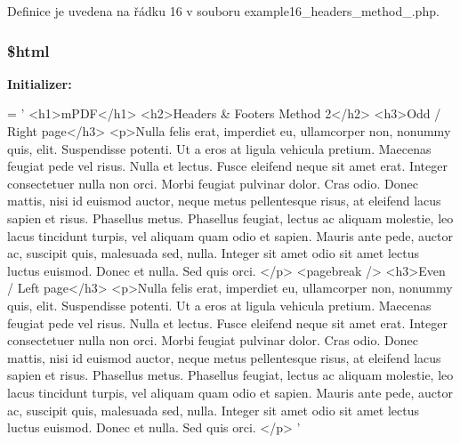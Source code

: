 Definice je uvedena na řádku 16 v souboru example16\-\_\-headers\-\_\-method\-\_.\-php.

\hypertarget{example16__headers__method__2_8php_a6f96e7fc92441776c9d1cd3386663b40}{
\subsubsection[{\$html}]{\setlength{\rightskip}{0pt plus 5cm}\$html}}\label{example16__headers__method__2_8php_a6f96e7fc92441776c9d1cd3386663b40}
{\bfseries Initializer\-:}
\begin{DoxyCode}
= \textcolor{stringliteral}{'}
\textcolor{stringliteral}{<h1>mPDF</h1>}
\textcolor{stringliteral}{<h2>Headers & Footers Method 2</h2>}
\textcolor{stringliteral}{<h3>Odd / Right page</h3>}
\textcolor{stringliteral}{<p>Nulla felis erat, imperdiet eu, ullamcorper non, nonummy quis, elit. Suspendisse potenti. Ut a eros at
       ligula vehicula pretium. Maecenas feugiat pede vel risus. Nulla et lectus. Fusce eleifend neque sit amet
       erat. Integer consectetuer nulla non orci. Morbi feugiat pulvinar dolor. Cras odio. Donec mattis, nisi id
       euismod auctor, neque metus pellentesque risus, at eleifend lacus sapien et risus. Phasellus metus. Phasellus
       feugiat, lectus ac aliquam molestie, leo lacus tincidunt turpis, vel aliquam quam odio et sapien. Mauris ante
       pede, auctor ac, suscipit quis, malesuada sed, nulla. Integer sit amet odio sit amet lectus luctus euismod.
       Donec et nulla. Sed quis orci. </p>}
\textcolor{stringliteral}{<pagebreak />}
\textcolor{stringliteral}{<h3>Even / Left page</h3>}
\textcolor{stringliteral}{<p>Nulla felis erat, imperdiet eu, ullamcorper non, nonummy quis, elit. Suspendisse potenti. Ut a eros at
       ligula vehicula pretium. Maecenas feugiat pede vel risus. Nulla et lectus. Fusce eleifend neque sit amet
       erat. Integer consectetuer nulla non orci. Morbi feugiat pulvinar dolor. Cras odio. Donec mattis, nisi id
       euismod auctor, neque metus pellentesque risus, at eleifend lacus sapien et risus. Phasellus metus. Phasellus
       feugiat, lectus ac aliquam molestie, leo lacus tincidunt turpis, vel aliquam quam odio et sapien. Mauris ante
       pede, auctor ac, suscipit quis, malesuada sed, nulla. Integer sit amet odio sit amet lectus luctus euismod.
       Donec et nulla. Sed quis orci. </p>}
\textcolor{stringliteral}{'}
\end{DoxyCode}


